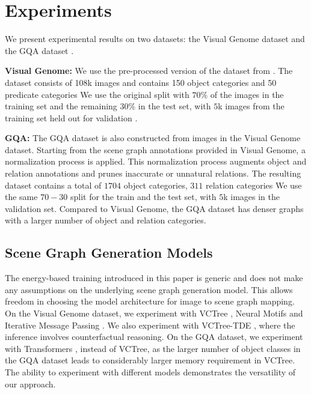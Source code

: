 \documentclass[final]{cvpr}
\begin{document}
\section{Experiments}
We present experimental results on two datasets: the Visual Genome dataset \cite{krishna2017visual} and the GQA dataset \cite{hudson2018gqa}.

\vspace{0.08in}
\noindent
\textbf{Visual Genome:} We use the pre-processed version of the dataset from \cite{xu2017scene}. The dataset consists of 108k images and contains 150 object categories and 50 predicate categories
We use the original split with $70\%$ of the images in the training set and the remaining $30\%$ in the test set, with $5$k images from the training set held out for validation \cite{zellers2018neural}.

\vspace{0.08in}
\noindent
\textbf{GQA:} The GQA dataset \cite{hudson2018gqa} is also constructed from images in the Visual Genome dataset. Starting from the scene graph annotations provided in Visual Genome, a normalization process is applied. This normalization process 
augments object and relation annotations and prunes inaccurate or unnatural relations. The resulting dataset contains a total of $1704$ object categories, $311$ relation categories 
We use the same $70-30$ split for the train and the test set, with $5$k images in the validation set. Compared to Visual Genome, the GQA dataset has denser graphs with a larger number of object and relation categories. 


\subsection{Scene Graph Generation Models}
The energy-based training introduced in this paper is generic and does not make any assumptions on the underlying scene graph generation model. This allows freedom in choosing the model architecture for image to scene graph mapping. On the Visual Genome dataset, we experiment with VCTree \cite{tang2019learning}, Neural Motifs \cite{zellers2018neural} and Iterative Message Passing \cite{xu2017scene}. We also experiment with VCTree-TDE \cite{tang2020unbiased}, where the inference involves counterfactual reasoning. On the GQA dataset, we experiment with Transformers \cite{vaswani2017attention}, instead of VCTree, as the larger number of object classes in the GQA dataset leads to considerably larger memory requirement in VCTree. The ability to experiment with different models demonstrates the versatility of our approach.
\end{document}
